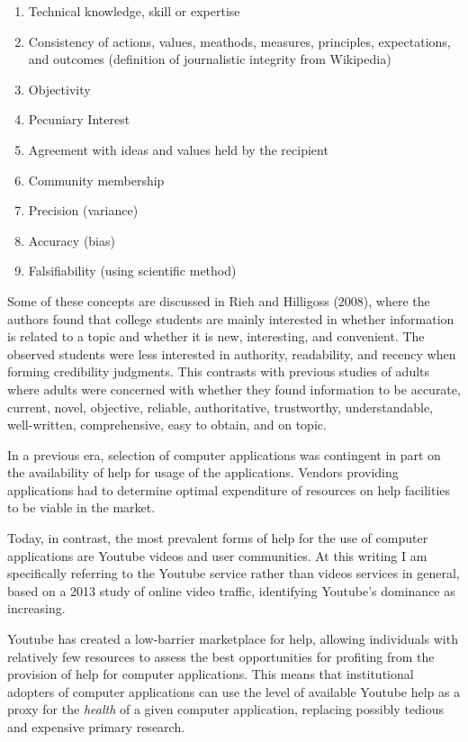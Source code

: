 \begin{enumerate}
\def\labelenumi{\arabic{enumi}.}
\tightlist
\item
  Technical knowledge, skill or expertise
\item
  Consistency of actions, values, meathods, measures, principles,
  expectations, and outcomes (definition of journalistic integrity from
  Wikipedia)
\item
  Objectivity
\item
  Pecuniary Interest
\item
  Agreement with ideas and values held by the recipient
\item
  Community membership
\item
  Precision (variance)
\item
  Accuracy (bias)
\item
  Falsifiability (using scientific method)
\end{enumerate}

Some of these concepts are discussed in Rieh and Hilligoss (2008), where
the authors found that college students are mainly interested in whether
information is related to a topic and whether it is new, interesting,
and convenient. The observed students were less interested in authority,
readability, and recency when forming credibility judgments. This
contrasts with previous studies of adults where adults were concerned
with whether they found information to be accurate, current, novel,
objective, reliable, authoritative, trustworthy, understandable,
well-written, comprehensive, easy to obtain, and on topic.

\hypertarget{getting-help}{%
\label{getting-help}}

In a previous era, selection of computer applications was contingent in
part on the availability of help for usage of the applications. Vendors
providing applications had to determine optimal expenditure of resources
on help facilities to be viable in the market.

Today, in contrast, the most prevalent forms of help for the use of
computer applications are Youtube videos and user communities. At this
writing I am specifically referring to the Youtube service rather than
videos services in general, based on a 2013 study of online video
traffic, identifying Youtube's dominance as increasing.

Youtube has created a low-barrier marketplace for help, allowing
individuals with relatively few resources to assess the best
opportunities for profiting from the provision of help for computer
applications. This means that institutional adopters of computer
applications can use the level of available Youtube help as a proxy for
the \emph{health} of a given computer application, replacing possibly
tedious and expensive primary research.

